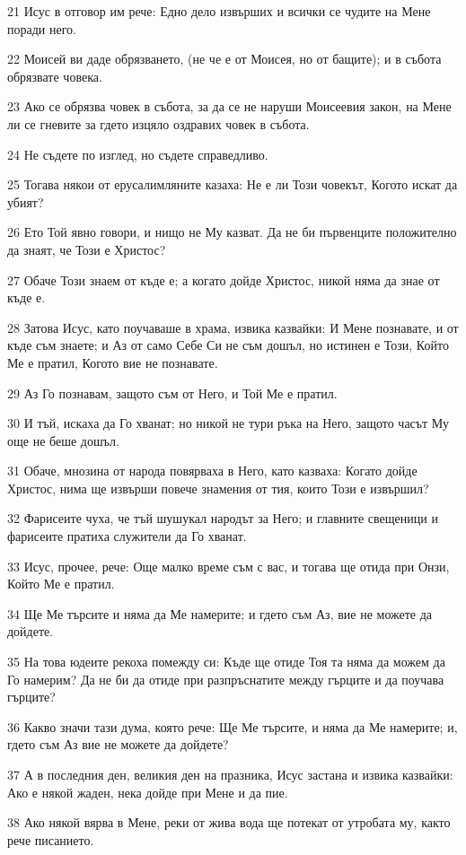 \par 21 Исус в отговор им рече: Едно дело извърших и всички се чудите на Мене поради него.
\par 22 Моисей ви даде обрязването, (не че е от Моисея, но от бащите); и в събота обрязвате човека.
\par 23 Ако се обрязва човек в събота, за да се не наруши Моисеевия закон, на Мене ли се гневите за гдето изцяло оздравих човек в събота.
\par 24 Не съдете по изглед, но съдете справедливо.
\par 25 Тогава някои от ерусалимляните казаха: Не е ли Този човекът, Когото искат да убият?
\par 26 Ето Той явно говори, и нищо не Му казват. Да не би първенците положително да знаят, че Този е Христос?
\par 27 Обаче Този знаем от къде е; а когато дойде Христос, никой няма да знае от къде е.
\par 28 Затова Исус, като поучаваше в храма, извика казвайки: И Мене познавате, и от къде съм знаете; и Аз от само Себе Си не съм дошъл, но истинен е Този, Който Ме е пратил, Когото вие не познавате.
\par 29 Аз Го познавам, защото съм от Него, и Той Ме е пратил.
\par 30 И тъй, искаха да Го хванат; но никой не тури ръка на Него, защото часът Му още не беше дошъл.
\par 31 Обаче, мнозина от народа повярваха в Него, като казваха: Когато дойде Христос, нима ще извърши повече знамения от тия, които Този е извършил?
\par 32 Фарисеите чуха, че тъй шушукал народът за Него; и главните свещеници и фарисеите пратиха служители да Го хванат.
\par 33 Исус, прочее, рече: Още малко време съм с вас, и тогава ще отида при Онзи, Който Ме е пратил.
\par 34 Ще Ме търсите и няма да Ме намерите; и гдето съм Аз, вие не можете да дойдете.
\par 35 На това юдеите рекоха помежду си: Къде ще отиде Тоя та няма да можем да Го намерим? Да не би да отиде при разпръснатите между гърците и да поучава гърците?
\par 36 Какво значи тази дума, която рече: Ще Ме търсите, и няма да Ме намерите; и, гдето съм Аз вие не можете да дойдете?
\par 37 А в последния ден, великия ден на празника, Исус застана и извика казвайки: Ако е някой жаден, нека дойде при Мене и да пие.
\par 38 Ако някой вярва в Мене, реки от жива вода ще потекат от утробата му, както рече писанието.
